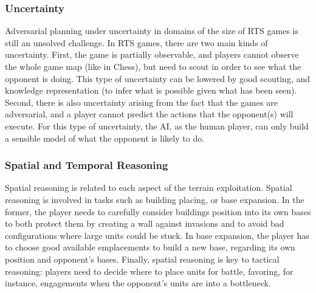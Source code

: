 \documentclass[journal]{IEEEtran}
\begin{document}
\subsubsection{Uncertainty}
Adversarial planning under uncertainty in domains of the size of RTS games is still an unsolved challenge.
In RTS games, there are two main kinds of uncertainty. First, the game is partially observable, and players cannot observe the whole game map (like in Chess), but need to scout in order to see what the opponent is doing. This type of uncertainty can be lowered by good scouting, and knowledge representation (to infer what is possible given what has been seen). Second, there is also uncertainty arising from the fact that the games are adversarial, and a player cannot predict the actions that the opponent(s) will execute. For this type of uncertainty, the AI, as the human player, can only build a sensible model of what the opponent is likely to do. 

\subsubsection{Spatial and Temporal Reasoning}
Spatial  reasoning   is  related  to   each  aspect  of   the  terrain
exploitation.  Spatial reasoning is involved in tasks such as building placing, or base expansion. In the former, the player needs to
carefully  consider buildings  position  into its  own  bases to  both
protect them  by creating  a wall against  invasions and to  avoid bad
configurations  where large  units could  be stuck. In base expansion, the player has to
choose good available emplacements to  build a new base, regarding its
own  position  and opponent's  bases.  Finally,  spatial reasoning  is
key to tactical reasoning: players need to decide where to place units
for battle,  favoring, for  instance, engagements when  the opponent's
units are into a bottleneck. 
\end{document}
